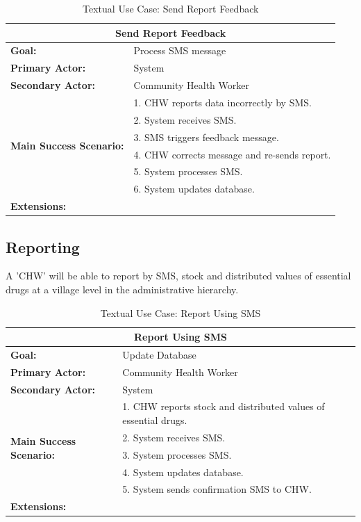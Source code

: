 \documentclass[a4paper, 11pt]{report}
\begin{document}
\begin{table}[h]
	\centering
	\begin{tabular}{|l|l|}
		\hline
		\multicolumn{2}{|c|}{\textbf{Send Report Feedback}} \\
		\hline
		\textbf{Goal:} & Process SMS message\\
		\hline
		\textbf{Primary Actor:} & System \\
		\hline
		\textbf{Secondary Actor:} & Community Health Worker \\
		\hline
		\multirow{6}{*}{\textbf{Main Success Scenario:}}	& 1. CHW reports data incorrectly by SMS. \\
																											& 2. System receives SMS. \\
																											& 3. SMS triggers feedback message. \\
																											& 4. CHW corrects message and re-sends report. \\
																											& 5. System processes SMS. \\
																											& 6. System updates database. \\
		\hline
		\textbf{Extensions:} & \\
		\hline
	\end{tabular}
	\caption{Textual Use Case: Send Report Feedback}
\end{table}
\pagebreak

\subsection{Reporting}

A 'CHW' will be able to report by SMS, stock and distributed values of essential drugs at a village level in the administrative hierarchy. 

\begin{table}[h]
	\centering
	\begin{tabular}{|l|l|}
		\hline
		\multicolumn{2}{|c|}{\textbf{Report Using SMS}}\\
		\hline
		\textbf{Goal:} & Update Database \\
		\hline
		\textbf{Primary Actor:} & Community Health Worker\\
		\hline
		\textbf{Secondary Actor:} & System \\
		\hline
		\multirow{5}{*}{\textbf{Main Success Scenario:}}	& 1. CHW reports stock and distributed values of essential drugs. \\
																											& 2. System receives SMS. \\
																											& 3. System processes SMS. \\
																											& 4. System updates database. \\
																											& 5. System sends confirmation SMS to CHW. \\
		\hline
		\textbf{Extensions:} & \\
		\hline
	\end{tabular}
	\caption{Textual Use Case: Report Using SMS}
\end{table}
\pagebreak
\end{document}
